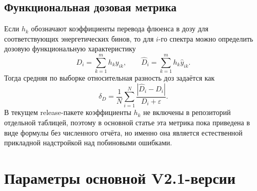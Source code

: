 \documentclass[11pt]{article}
\begin{document}
\subsection{Функциональная дозовая метрика}

Если $h_k$ обозначают коэффициенты перевода флюенса в дозу для соответствующих энергетических бинов, то для $i$-го спектра можно определить дозовую функциональную характеристику
\begin{equation}
D_i = \sum_{k=1}^{m} h_k y_{ik},
\qquad
\hat{D}_i = \sum_{k=1}^{m} h_k \hat{y}_{ik}.
\end{equation}
Тогда средняя по выборке относительная разность доз задаётся как
\begin{equation}
\delta_D = \frac{1}{N}\sum_{i=1}^{N}\frac{|\hat{D}_i-D_i|}{D_i+\varepsilon}.
\end{equation}
В текущем release-пакете коэффициенты $h_k$ не включены в репозиторий отдельной таблицей, поэтому в основной статье эта метрика пока приведена в виде формулы без численного отчёта, но именно она является естественной прикладной надстройкой над побиновыми ошибками.

\section{Параметры основной V2.1-версии}
\end{document}
